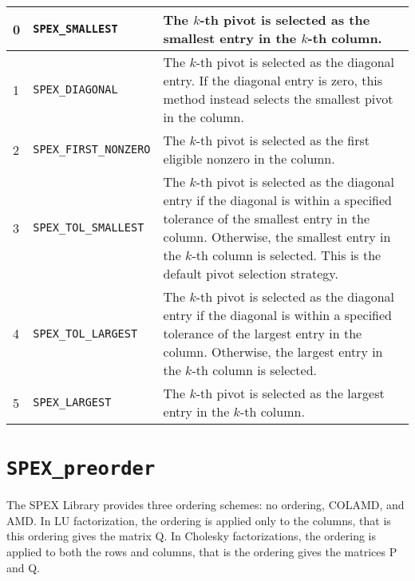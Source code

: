 \documentclass[12pt,oneside]{book}
\theoremstyle{definition}
\newenvironment{SizedCenteredTabular}[2][\small]
    {   
        #1\begin{center}\begin{tabular}{#2}
    }{ 
        \end{tabular}\end{center}
    }
\begin{document}
\begin{SizedCenteredTabular}{llp{4in}}\hline
    0 & \verb|SPEX_SMALLEST|        & The $k$-th pivot is selected as the smallest 
                                      entry in the $k$-th column.\\ \hline
    1 & \verb|SPEX_DIAGONAL|        & The $k$-th pivot is selected as the diagonal
                                      entry. If the diagonal entry is zero,
                                      this method instead selects the smallest
                                      pivot in the column.\\ \hline
    2 & \verb|SPEX_FIRST_NONZERO|   & The $k$-th pivot is selected as the first
                                      eligible nonzero in the column. \\ \hline
    3 & \verb|SPEX_TOL_SMALLEST|    & The $k$-th pivot is selected as the diagonal
                                      entry if the diagonal is within a
                                      specified tolerance of the smallest entry in
                                      the column. Otherwise, the smallest
                                      entry in the $k$-th column is selected.
                                      This is the default pivot selection
                                      strategy. \\ \hline
    4 & \verb|SPEX_TOL_LARGEST|     & The $k$-th pivot is selected as the diagonal
                                      entry if the diagonal is within a
                                      specified tolerance of the largest entry in
                                      the column.  Otherwise, the largest
                                      entry in the $k$-th column is selected. \\ \hline
    5 & \verb|SPEX_LARGEST|         & The $k$-th pivot is selected as the largest
                                          entry in the $k$-th column. \\ \hline
\end{SizedCenteredTabular}

\section{\texttt{SPEX\_preorder}} \label{ss:SPEX_preorder}
The SPEX Library provides three ordering schemes: no ordering, COLAMD, and AMD. In LU factorization, the ordering is applied only to the columns, that is this ordering gives the matrix Q. In Cholesky factorizations, the ordering is applied to both the rows and columns, that is the ordering gives the matrices P and Q.
\end{document}
